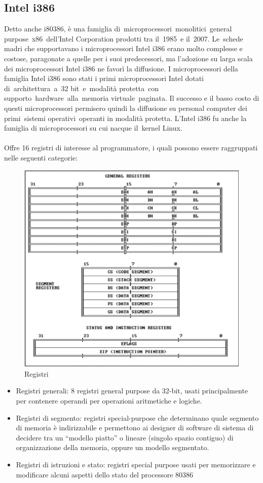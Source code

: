 \documentclass[8pt]{extarticle}
\begin{document}
\subsection{Intel i386}
Detto anche i80386, è una famiglia di microprocessori monolitici general purpose x86 dell'Intel Corporation 
prodotti tra il 1985 e il 2007. Le schede madri che supportavano i microprocessori Intel i386 erano 
molto complesse e costose, paragonate a quelle per i suoi predecessori, ma l'adozione su larga scala 
dei microprocessori Intel i386 ne favorì la diffusione. I microprocessori della famiglia Intel i386 
sono stati i primi microprocessori Intel dotati di architettura a 32 bit e modalità protetta con 
supporto hardware alla memoria virtuale paginata. Il successo e il basso costo di questi microprocessori 
permisero quindi la diffusione su personal computer dei primi sistemi operativi operanti in modalità 
protetta. L'Intel i386 fu anche la famiglia di microprocessori su cui nacque il kernel Linux.\\\\
Offre 16 registri di interesse al programmatore, i quali possono essere raggruppati nelle seguenti categorie:
\begin{figure}[H]
    \center
    \includegraphics[scale=0.2]{images/BO1.png}
    \caption{Registri}\label{fig:1}
\end{figure}
\begin{itemize}
    \item Registri generali: 8 registri general purpose da 32-bit, usati principalmente per contenere 
    operandi per operazioni aritmetiche e logiche.
    \item Registri di segmento: registri special-purpose che determinano quale segmento di memoria è 
    indirizzabile e permettono ai designer di software di sistema di decidere tra un “modello piatto” 
    o lineare (singolo spazio contiguo) di organizzazione della memoria, oppure un modello segmentato.
    \item Registri di istruzioni e stato: registri special purpose usati per memorizzare e modificare 
    alcuni aspetti dello stato del processore 80386
\end{itemize}
\end{document}
